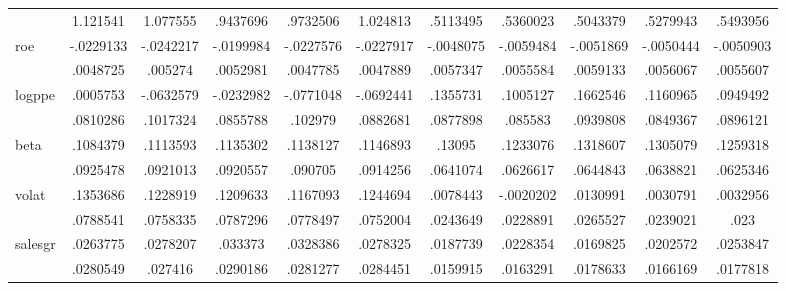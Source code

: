 \begin{table}[htbp]
\begin{tabular}{l*{10}{c}}
                & 1.121541         & 1.077555         & .9437696         & .9732506         & 1.024813         & .5113495         & .5360023         & .5043379         & .5279943         & .5493956         \\
roe             &-.0229133\sym{***}&-.0242217\sym{***}&-.0199984\sym{***}&-.0227576\sym{***}&-.0227917\sym{***}&-.0048075         &-.0059484         &-.0051869         &-.0050444         &-.0050903         \\
                & .0048725         &  .005274         & .0052981         & .0047785         & .0047889         & .0057347         & .0055584         & .0059133         & .0056067         & .0055607         \\
logppe          & .0005753         &-.0632579         &-.0232982         &-.0771048         &-.0692441         & .1355731         & .1005127         & .1662546\sym{*}  & .1160965         & .0949492         \\
                & .0810286         & .1017324         & .0855788         &  .102979         & .0882681         & .0877898         &  .085583         & .0939808         & .0849367         & .0896121         \\
beta            & .1084379         & .1113593         & .1135302         & .1138127         & .1146893         &   .13095\sym{**} & .1233076\sym{*}  & .1318607\sym{**} & .1305079\sym{**} & .1259318\sym{**} \\
                & .0925478         & .0921013         & .0920557         &  .090705         & .0914256         & .0641074         & .0626617         & .0644843         & .0638821         & .0625346         \\
volat           & .1353686\sym{*}  & .1228919         & .1209633         & .1167093         & .1244694         & .0078443         &-.0020202         & .0130991         & .0030791         & .0032956         \\
                & .0788541         & .0758335         & .0787296         & .0778497         & .0752004         & .0243649         & .0228891         & .0265527         & .0239021         &     .023         \\
salesgr         & .0263775         & .0278207         &  .033373         & .0328386         & .0278325         & .0187739         & .0228354         & .0169825         & .0202572         & .0253847         \\
                & .0280549         &  .027416         & .0290186         & .0281277         & .0284451         & .0159915         & .0163291         & .0178633         & .0166169         & .0177818         \\

\end{tabular}
\end{table}
